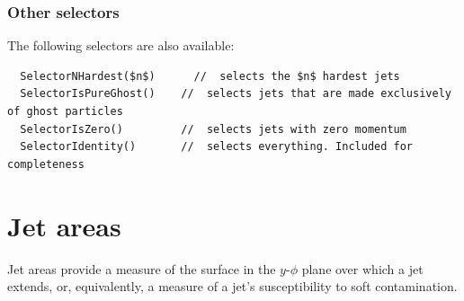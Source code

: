 \documentclass[12pt,a4]{article}
\begin{document}
\subsubsection{Other selectors}

The following selectors are also available:

\begin{lstlisting}
  SelectorNHardest($n$)      //  selects the $n$ hardest jets
  SelectorIsPureGhost()    //  selects jets that are made exclusively of ghost particles
  SelectorIsZero()         //  selects jets with zero momentum
  SelectorIdentity()       //  selects everything. Included for completeness
\end{lstlisting}




\section{Jet areas}
\label{sec:areas}

Jet areas provide a measure of the surface in the $y$-$\phi$ plane
over which a jet extends, or, equivalently, a measure of a jet's
susceptibility to soft contamination.
\end{document}
